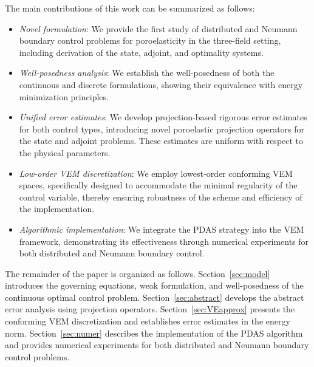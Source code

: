 \documentclass[smallextended]{svjour3}
\numberwithin{equation}{section}
\numberwithin{figure}{section}
\numberwithin{table}{section}
\begin{document}
\noindent The main contributions of this work can be summarized as follows:
\begin{itemize}
    \item {\it Novel formulation}: We provide the first study of distributed and Neumann boundary control problems for poroelasticity in the three-field setting, including derivation of the state, adjoint, and optimality systems.
    
    \item {\it Well-posedness analysis}: We establish the well-posedness of both the continuous and discrete formulations, showing their equivalence with energy minimization principles.
    
    \item {\it Unified error estimates}: We develop projection-based rigorous error estimates for both control types, introducing novel poroelastic projection operators for the state and adjoint problems. These estimates are uniform with respect to the physical parameters.
    
    \item {\it Low-order VEM discretization}: We employ lowest‑order conforming VEM spaces, specifically designed to accommodate the minimal regularity of the control variable, thereby ensuring robustness of the scheme and efficiency of the implementation.
    
    \item {\it Algorithmic implementation}: We integrate the PDAS strategy into the VEM framework, demonstrating its effectiveness through numerical experiments for both distributed and Neumann boundary control.
\end{itemize}

The remainder of the paper is organized as follows. Section~\ref{sec:model} introduces the governing equations, weak formulation, and well-posedness of the continuous optimal control problem. Section~\ref{sec:abstract} develops the abstract error analysis using projection operators. Section~\ref{sec:VEapprox} presents the conforming VEM discretization and establishes error estimates in the energy norm. Section~\ref{sec:numer} describes the implementation of the PDAS algorithm and provides numerical experiments for both distributed and Neumann boundary control problems.
\end{document}
